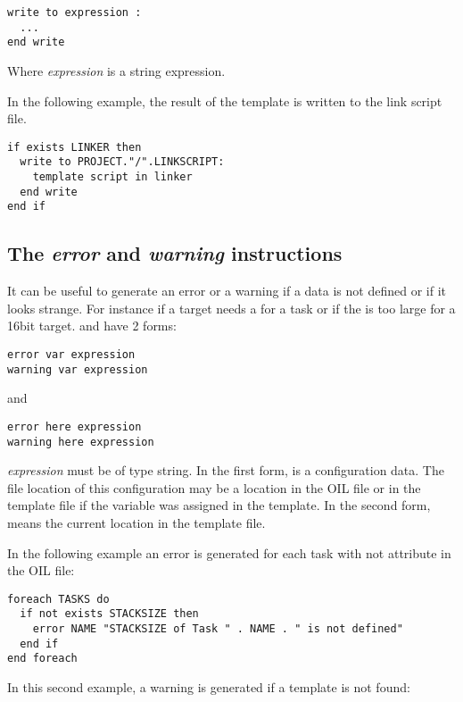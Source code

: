 \begin{lstlisting}
write to expression :
  ...
end write
\end{lstlisting}

Where {\em expression} is a string expression.

In the following example, the result of the  template is written to the link script file.

\begin{lstlisting}
if exists LINKER then
  write to PROJECT."/".LINKSCRIPT:
    template script in linker
  end write
end if
\end{lstlisting}


\subsection{The {\em error} and {\em warning} instructions}

It can be useful to generate an error or a warning if a data is not defined or if it looks strange. For instance if a target needs a  for a task or if the  is too large for a 16bit target.  and  have 2 forms:

\begin{lstlisting}
error var expression
warning var expression
\end{lstlisting}

and

\begin{lstlisting}
error here expression
warning here expression
\end{lstlisting}

{\em expression} must be of type string. In the first form,  is a configuration data. The file location of this configuration may be a location in the OIL file or in the template file if the variable was assigned in the template. In the second form,  means the current location in the template file.

In the following example an error is generated for each task with not  attribute in the OIL file:

\begin{lstlisting}
foreach TASKS do
  if not exists STACKSIZE then
    error NAME "STACKSIZE of Task " . NAME . " is not defined"
  end if
end foreach
\end{lstlisting}

In this second example, a warning is generated if a template is not found:

